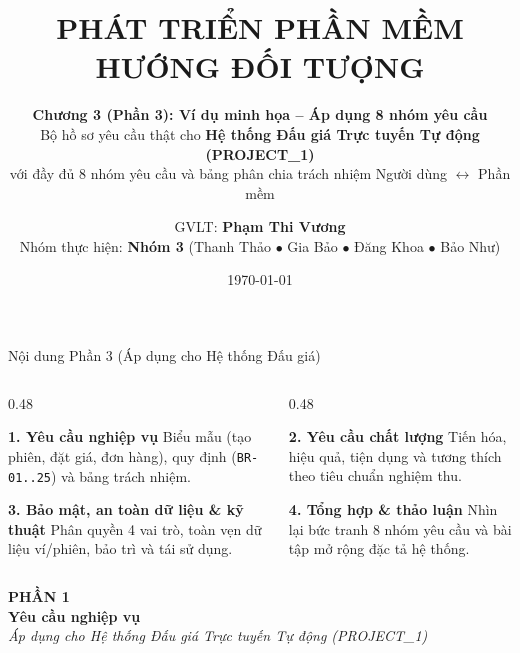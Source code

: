 \documentclass[aspectratio=169, 10pt]{beamer}
\title[Chương 3 (Phần 3): Áp dụng vào Hệ thống Đấu giá]{\textbf{PHÁT TRIỂN PHẦN MỀM HƯỚNG ĐỐI TƯỢNG}}
\subtitle{\textbf{Chương 3 (Phần 3): Ví dụ minh họa -- Áp dụng 8 nhóm yêu cầu}\\
\small Bộ hồ sơ yêu cầu thật cho \textbf{Hệ thống Đấu giá Trực tuyến Tự động (PROJECT\_1)}\\
với đầy đủ 8 nhóm yêu cầu và bảng phân chia trách nhiệm Người dùng $\leftrightarrow$ Phần mềm}
\author[Nhóm 3]{GVLT: \textbf{Phạm Thi Vương}\\
Nhóm thực hiện: \textbf{Nhóm 3} (Thanh Thảo $\bullet$ Gia Bảo $\bullet$ Đăng Khoa $\bullet$ Bảo Như)}
\institute[OOAD]{Học phần: Phát Triển Phần Mềm Hướng Đối Tượng (OOAD)}
\date{\today}
\begin{document}
\begin{frame}
    \titlepage
\end{frame}

\begin{frame}{Nội dung Phần 3 (Áp dụng cho Hệ thống Đấu giá)}
    \begin{columns}[t]
        \begin{column}{0.48\textwidth}
            \begin{block}{\textbf{1. Yêu cầu nghiệp vụ}}
                Biểu mẫu (tạo phiên, đặt giá, đơn hàng), quy định (\texttt{BR-01..25}) và bảng trách nhiệm.
            \end{block}
            \vspace{0.3cm}
            \begin{block}{\textbf{3. Bảo mật, an toàn dữ liệu \& kỹ thuật}}
                Phân quyền 4 vai trò, toàn vẹn dữ liệu ví/phiên, bảo trì và tái sử dụng.
            \end{block}
        \end{column}
        
        \begin{column}{0.48\textwidth}
            \begin{block}{\textbf{2. Yêu cầu chất lượng}}
                Tiến hóa, hiệu quả, tiện dụng và tương thích theo tiêu chuẩn nghiệm thu.
            \end{block}
            \vspace{0.3cm}
            \begin{block}{\textbf{4. Tổng hợp \& thảo luận}}
                Nhìn lại bức tranh 8 nhóm yêu cầu và bài tập mở rộng đặc tả hệ thống.
            \end{block}
        \end{column}
    \end{columns}
\end{frame}

\begin{frame}
    \begin{center}
        \vspace{1.5cm}
        {\Large \textbf{\color{primaryNavy}PHẦN 1}}\\[0.5cm]
        {\huge \textbf{\color{primaryNavy}Yêu cầu nghiệp vụ}}\\[0.6cm]
        \textit{\color{secondarySlate}Áp dụng cho Hệ thống Đấu giá Trực tuyến Tự động (PROJECT\_1)}
    \end{center}
\end{frame}
\end{document}
